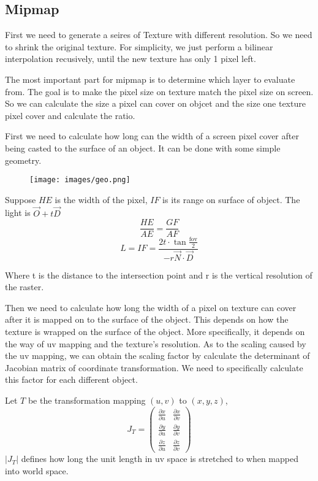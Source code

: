 \documentclass[acmtog]{acmart}
\begin{document}
\subsection{Mipmap}
First we need to generate a seires of Texture with different resolution. So we need to shrink the original texture. For simplicity, we just perform a bilinear interpolation recusively, until the new texture has only 1 pixel left.
    
The most important part for mipmap is to determine which layer to evaluate from. The goal is to make the pixel size on texture match the pixel size on screen. So we can calculate the size a pixel can cover on objcet and the size one texture pixel cover and calculate the ratio.
    
First we need to calculate how long can the width of a screen pixel cover after being casted to the surface of an object. It can be done with some simple geometry.
    
\begin{figure}[h]
    \centering
    \texttt{[image: images/geo.png]}
\end{figure}

Suppose $HE$ is the width of the pixel, $IF$ is its range on surface of object. The light is $\vec{O} + t\vec{D}$
\[\frac{HE}{AE} = \frac{GF}{AF}\]
\[L = IF = \frac{2 t \cdot \tan \frac{\mathrm{fov}}{2}}{- r \vec{N}\cdot \vec{D}}\]

Where t is the distance to the intersection point and r is the vertical resolution of the raster.

Then we need to calculate how long the width of a pixel on texture can cover after it is mapped on to the surface of the object. This depends on how the texture is wrapped on the surface of the
object. More specifically, it depends on the way of uv mapping and the texture's resolution.
As to the scaling caused by the uv mapping, we can obtain the scaling factor by calculate the determinant of Jacobian matrix of coordinate transformation. We need to specifically calculate this factor for each different object.

Let $T$ be the transformation mapping $(u,v)$ to $(x,y,z)$, 
\[
    J_T = \left(\begin{matrix}
        \frac{\partial x}{\partial u} & \frac{\partial x}{\partial v}\\
        \frac{\partial y}{\partial u} & \frac{\partial y}{\partial v}\\
        \frac{\partial z}{\partial u} & \frac{\partial z}{\partial v}
    \end{matrix}\right)
\]
$|J_T|$ defines how long the unit length in uv space is stretched to when mapped into world space. 
\end{document}
